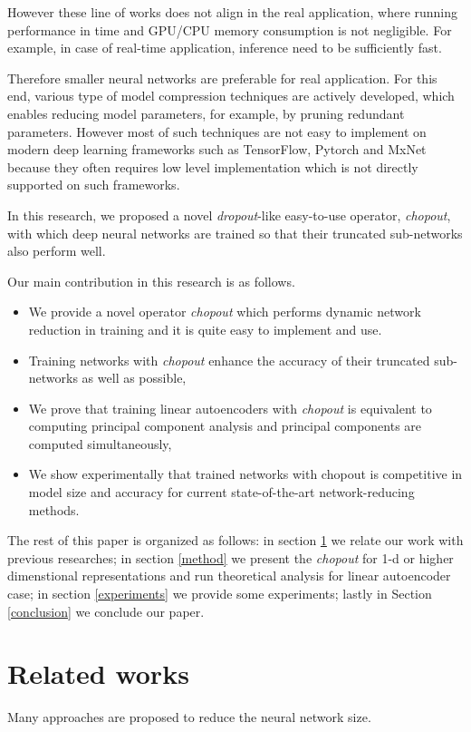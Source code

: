 \documentclass{article}
\begin{document}
    However these line of works does not align in the real application, where running performance in time and GPU/CPU memory consumption is not negligible. For example, in case of real-time application, inference need to be sufficiently fast. 

    Therefore smaller neural networks are preferable for real application. For this end, various type of model compression techniques are actively developed, which enables reducing model parameters, for example, by pruning redundant parameters. However most of such techniques are not easy to implement on modern deep learning frameworks such as TensorFlow, Pytorch and MxNet because they often requires low level implementation which is not directly supported on such frameworks.

    In this research, we proposed a novel \textit{dropout}-like easy-to-use operator, \textit{chopout}, with which deep neural networks are trained so that their truncated sub-networks also perform well. 

        
    Our main contribution in this research is as follows.
    \begin{itemize} 
      \item We provide a novel operator \textit{chopout} which performs dynamic network reduction in training and it is quite easy to implement and use.      
      \item Training networks with \textit{chopout} enhance the accuracy of their truncated sub-networks as well as possible,
      \item We prove that training linear autoencoders with \textit{chopout} is equivalent to computing principal component analysis and
      principal components are computed simultaneously, 
      \item We show experimentally that trained networks with chopout is competitive in model size and accuracy for current state-of-the-art network-reducing methods.
    \end{itemize}

    The rest of this paper is organized as follows: 
    in section \ref{related_works} we relate our work with previous researches;
    in section \ref{method} we present the \textit{chopout} for 1-d or higher dimenstional representations and run theoretical analysis for linear autoencoder case;
    in section \ref{experiments} we provide some experiments; 
    lastly in Section \ref{conclusion} we conclude our paper. 

    \section{Related works}
    \label{related_works}
    Many approaches are proposed to reduce the neural network size. 
    
\end{document}
